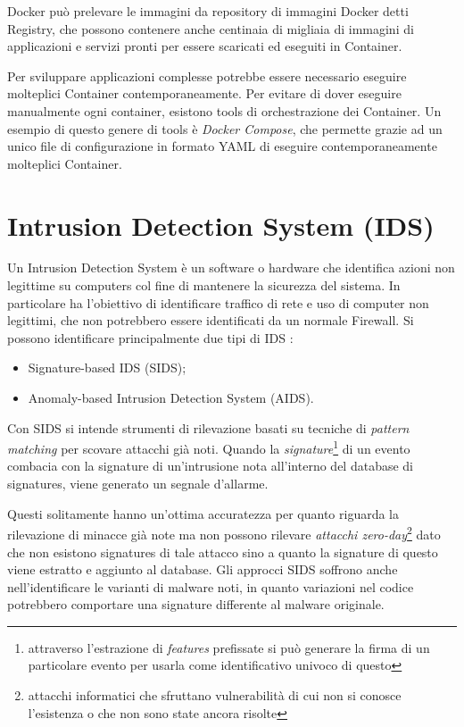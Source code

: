Docker può prelevare le immagini da repository di immagini Docker detti Registry, che possono contenere anche centinaia di migliaia di immagini di applicazioni e servizi pronti per essere scaricati ed eseguiti in Container.

Per sviluppare applicazioni complesse  potrebbe essere necessario eseguire molteplici Container contemporaneamente. Per evitare di dover eseguire manualmente ogni container, esistono tools di orchestrazione dei Container. Un esempio di questo genere di tools è \textit{Docker Compose}, che permette grazie ad un unico file di configurazione in formato YAML di eseguire contemporaneamente  molteplici Container.
\clearpage
\chapter{Intrusion Detection System (IDS)}
Un Intrusion Detection System è un software o hardware che identifica azioni non legittime su computers col fine di mantenere la sicurezza del sistema. In particolare ha l'obiettivo di identificare traffico di rete e uso di computer non legittimi, che non potrebbero essere identificati da un normale Firewall. Si possono identificare principalmente due tipi di IDS \cite{khraisat2019survey}:
\begin{itemize}
    \item Signature-based IDS (SIDS);
    \item Anomaly-based Intrusion Detection System (AIDS).
\end{itemize}

Con SIDS si intende strumenti di rilevazione basati su tecniche di \textit{pattern matching} per scovare attacchi già noti. Quando la \textit{signature}\footnote{attraverso l'estrazione di \textit{features} prefissate si può generare la firma  di un particolare evento per usarla come identificativo univoco di questo} di un evento combacia con la signature di un'intrusione nota all'interno del database di signatures, viene generato un segnale d'allarme.

Questi solitamente hanno un'ottima accuratezza per quanto riguarda la rilevazione di minacce già note ma non possono rilevare \textit{attacchi zero-day}\footnote{attacchi informatici che sfruttano vulnerabilità di cui non si conosce l'esistenza o che non sono state ancora risolte} dato che non esistono signatures di tale attacco sino a quanto la signature di questo viene estratto e aggiunto al database.
Gli approcci SIDS soffrono anche nell'identificare le varianti di malware noti, in quanto variazioni nel codice potrebbero comportare una signature differente al malware originale.

